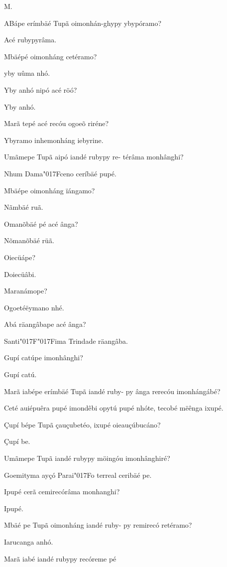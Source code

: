 \documentclass[openany,titlepage,12pt]{book}
\newcommand{\lgS}{\char"017F}
\newcommand{\lgSS}{\char"017F\char"017F}
\newcommand{\comecalista}[5]{
    \hspace*{-11.7pt}
    \begin{minipage}[t]{0.08\linewidth}
        \flushright #1\\#2
    \end{minipage}
    \hspace{0pt}
    \begin{minipage}[t]{0.94\linewidth}
        \lettrine
        [findent =2pt, nindent=0pt,  lines=2]
        {#3}{#4}#5
    \end{minipage}
    \vspace*{-3pt}
}
\begin{document}
\comecalista{M.}{}{A}{B}
    {ápe erímbäé Tupã oimonhán-ghypy
    ybypóramo?}
\begin{altereven}
    \item Acé rubypyrâma.
    \item Mbäépé oimonháng cetéramo?
    \item yby uûma nhó.
    \item Yby anhó nipó acé röó?
    \item Yby anhó.
    \item Marã tepé acé recóu ogoeõ riréne?
    \item Ybyramo inhemonháng iebyrine.
    \item Umãmepe Tupã aipó iandé rubypy re-
    térâma monhânghi?
    \item Nhum Dama\lgS ceno ceríbäé pupé.
    \item Mbäépe oimonháng ïángamo?
    \item Nãmbäé ruã.
    \item Omanõbäé pé acé ânga?
    \item Nõmanõbäé rüã.
    \item Oiecüápe?
    \item Doiecüâbi.
    \item Maranámope?
    \item Ogoetéëymano nhé.
    \item Abá räangâbape acé ânga?\newpage
    \item Santi\lgSS ima Trindade räangâba.
    \item Gupí catúpe imonhânghi?
    \item Gupí catú.
    \item Marã iabépe erímbäé Tupã iandé ruby-
    py ânga rerecóu imonhángábé?
    \item Ceté auiépuêra pupé imondêbi opytú
    pupé nhóte, tecobé mëênga ixupé.
    \item Çupí bépe Tupã çauçubetéo, ixupé
    oieauçúbucáno?
    \item Çupí be.
    \item Umãmepe Tupã iandé rubypy möingóu
    imonhânghiré?
    \item Goemityma ayçó Parai\lgS o terreal
    ceribäé pe.
    \item Ipupé cerã cemirecórâma monhanghi?
    \item Ipupé.
    \item Mbäé pe Tupã oimonháng iandé ruby-
    py remirecó retéramo?
    \item Iarucanga anhó.
    \item Marã iabé iandé rubypy recóreme pé

\end{altereven}
\end{document}
